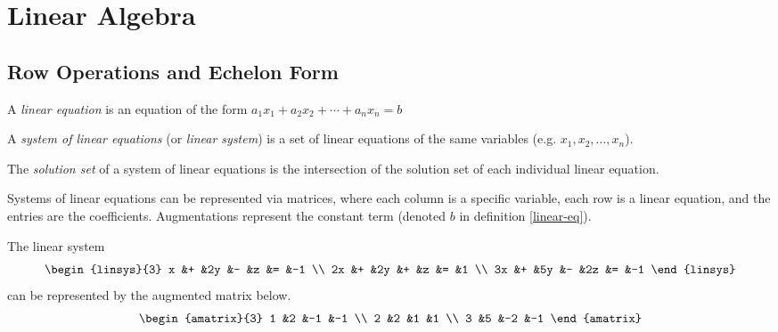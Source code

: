 
\chapter{Linear Algebra}
\label{ch:linear}

\section{Row Operations and Echelon Form}

\begin{defn}\label{linear-eq}
    A \emph{linear equation} is an equation of the form $a_1x_1 + a_2x_2 + \cdots + a_nx_n = b$
\end{defn}

\begin{defn}\label{linear-sys}
    A \emph{system of linear equations} (or \emph{linear system}) is a set of linear equations of the same variables (e.g. $x_1, x_2, \ldots, x_n$).
\end{defn}

\begin{defn}\label{linear-sys-solutions}
    The \emph{solution set} of a system of linear equations is the intersection of the solution set of each individual linear equation.
\end{defn}

Systems of linear equations can be represented via matrices, where each column is a specific variable, each row is a linear equation, and the entries are the coefficients. Augmentations represent the constant term (denoted $b$ in definition \ref{linear-eq}).

\begin{exmp}
    The linear system \[\begin{linsys}{3}
            x &+ &2y &- &z &= &-1 \\
            2x &+ &2y &+ &z &= &1 \\
            3x &+ &5y &- &2z &= &-1
        \end{linsys}\] can be represented by the augmented matrix below.
    \[\begin{amatrix}{3}
            1 &2 &-1 &-1 \\
            2 &2 &1 &1 \\
            3 &5 &-2 &-1
        \end{amatrix}\]
\end{exmp}

